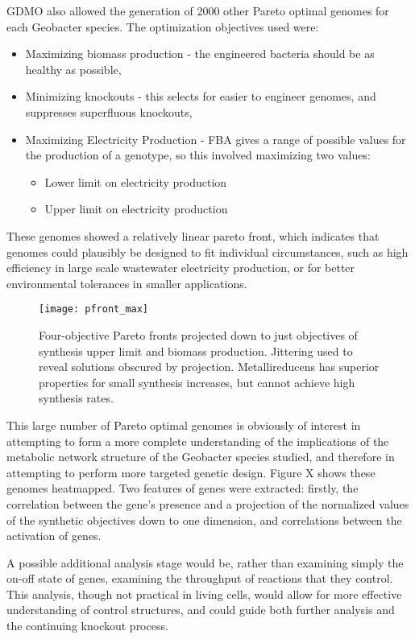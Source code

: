 \documentclass[a4paper,twocolumn]{article}
\begin{document}
GDMO also allowed the generation of 2000 other Pareto optimal genomes for each Geobacter species. The optimization objectives used were:
\begin{itemize}
	\item Maximizing biomass production - the engineered bacteria should be as healthy as possible,
	\item Minimizing knockouts - this selects for easier to engineer genomes, and suppresses superfluous knockouts,
	\item Maximizing Electricity Production - FBA gives a range of possible values for the production of a genotype, so this involved maximizing two values:
	\begin{itemize}
		\item Lower limit on electricity production
		\item Upper limit on electricity production
	\end{itemize}
\end{itemize}
These genomes showed a relatively linear pareto front, which indicates that genomes could plausibly be designed to fit individual circumstances, such as high efficiency in large scale wastewater electricity production, or for better environmental tolerances in smaller applications.

\begin{figure}[h]
\texttt{[image: pfront\_max]}
\caption{Four-objective Pareto fronts projected down to just objectives of synthesis upper limit and biomass production. Jittering used to reveal solutions obscured by projection. Metallireducens has superior properties for small synthesis increases, but cannot achieve high synthesis rates.}
\end{figure}


This large number of Pareto optimal genomes is obviously of interest in attempting to form a more complete understanding of the implications of the metabolic network structure of the Geobacter species studied, and therefore in attempting to perform more targeted genetic design. Figure X shows these genomes heatmapped. Two features of genes were extracted: firstly, the correlation between the gene’s presence and a projection of the normalized values of the synthetic objectives down to one dimension, and correlations between the activation of genes. 

A possible additional analysis stage would be, rather than examining simply the on-off state of genes, examining the throughput of reactions that they control. This analysis, though not practical in living cells, would allow for more effective understanding of control structures, and could guide both further analysis and the continuing knockout process.
\end{document}
